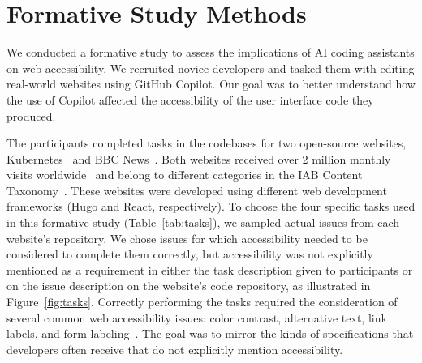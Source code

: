 \section{Formative Study Methods}
\label{form_methods}
We conducted a formative study to assess the implications of AI coding assistants on web accessibility. We recruited novice developers and tasked them with editing real-world websites using GitHub Copilot. Our goal was to better understand how the use of Copilot affected the accessibility of the user interface code they produced.




The participants completed tasks in the codebases for two open-source websites, Kubernetes~\cite{kubernetes} and BBC News~\cite{bbcnews}. Both websites received over 2 million monthly visits worldwide~\cite{similarweb2024} and belong to different categories in the IAB Content Taxonomy~\cite{webshrinker2024}. These websites were developed using different web development frameworks (Hugo and React, respectively). To choose the four specific tasks used in this formative study (Table~\ref{tab:tasks}), we sampled actual issues from each website's repository. We chose issues for which accessibility needed to be considered to complete them correctly, but accessibility was not explicitly mentioned as a requirement in either the task description given to participants or on the issue description on the website's code repository, as illustrated in Figure~\ref{fig:tasks}. Correctly performing the tasks required the consideration of several common web accessibility issues: color contrast, alternative text, link labels, and form labeling~\cite{webaim2024}. The goal was to mirror the kinds of specifications that developers often receive that do not explicitly mention accessibility.



